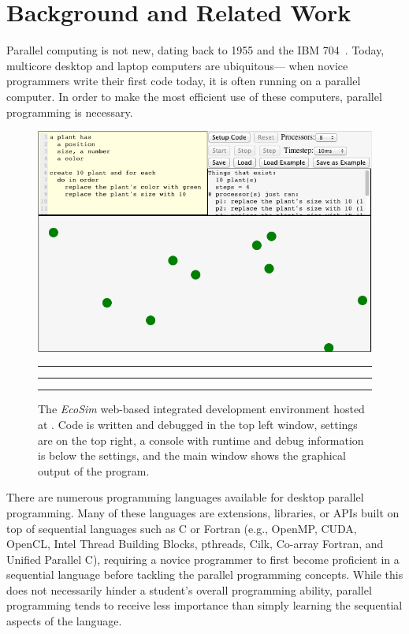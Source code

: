 \documentclass{sig-alternate}
\begin{document}
\section{Background and Related Work}
Parallel computing is not new, dating back to 1955 and the IBM 704~\cite{hockney1988parallel}.
Today, multicore desktop and laptop computers are ubiquitous---%
when novice programmers write their first code today, it is often running on a parallel computer.
In order to make the most efficient use of these computers, parallel programming is necessary.  

\begin{figure}
\centerline{\includegraphics[width=.49\textwidth]{figures/EcosimScreencap2}}
\hrule\vspace{-0.8em}
\caption{The \emph{EcoSim} web-based integrated development environment hosted at
\ecosimPath{}.  Code is written and debugged in the top left window, settings are on
the top right, a console with runtime and debug information is below the settings, and the
main window shows the graphical output of the program.}
\vspace*{0.2em}\hrule\hrule
\label{fig:ecosimScreencap}
\end{figure}



There are numerous programming languages available for desktop parallel programming.  Many of
these languages are extensions, libraries, or APIs built on top of sequential languages such 
as C or Fortran 
(e.g., OpenMP, CUDA, OpenCL, Intel Thread Building Blocks, pthreads, Cilk, Co-array Fortran, and Unified Parallel C),
requiring a novice programmer to first become proficient in a sequential language 
before tackling the parallel programming concepts.  
While this does not necessarily hinder a student's overall programming ability, 
parallel programming tends to receive less importance 
than simply learning the sequential aspects of the language.  
\end{document}
